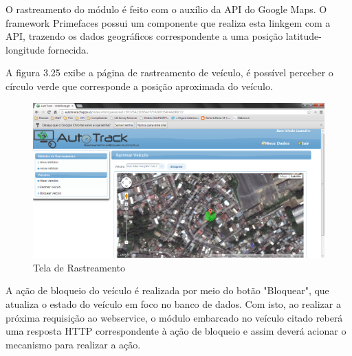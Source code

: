 O rastreamento do módulo é feito com o auxílio da API do Google Maps. O framework Primefaces possui um componente que realiza esta linkgem com a API, trazendo os dados geográficos correspondente a uma posição latitude-longitude fornecida.

A figura 3.25 exibe a página de rastreamento de veículo, é possível perceber o círculo verde que corresponde a posição aproximada do veículo.

\begin{figure}[!htb]
	\centering
	\includegraphics[width=\textwidth]{figures/webmanager_rastrear.png}
	\caption{Tela de Rastreamento}
	\label{Figura 15}
\end{figure}

A ação de bloqueio do veículo é realizada por meio do botão "Bloquear", que atualiza o estado do veículo em foco no banco de dados. Com isto, ao realizar a próxima requisição ao webservice, o módulo embarcado no veículo citado reberá uma resposta HTTP correspondente à ação de bloqueio e assim deverá acionar o mecanismo para realizar a ação.

\hfill

